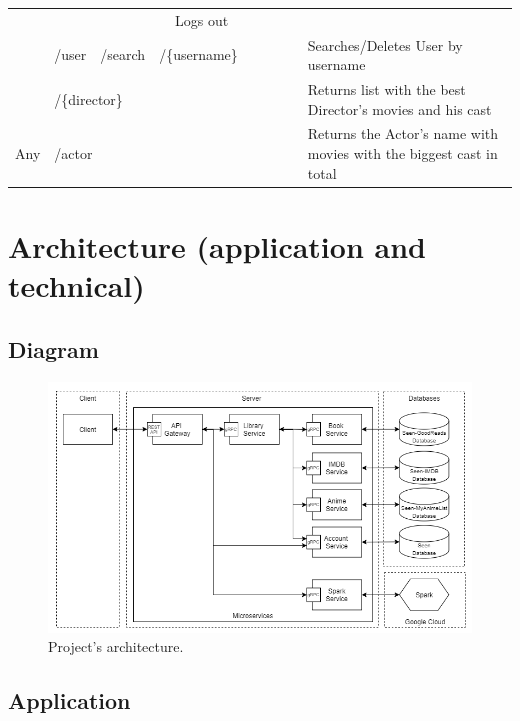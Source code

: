 \documentclass{article}
\newcommand{\xmark}{\ding{53}} %
\begin{document}
\begin{table}[H]
\begin{adjustbox}{width=1.6\textwidth}
\begin{tabular}{ c|l l l l|c|c|c|c|l }
    \xmark & & & &
    Logs out
    \\ \rowcolor{Gray}
    \multirow{-2}{*}{Regular} 
    & /user & /search & \multicolumn{2}{l|}{/\{username\}} &
    \xmark & & & \xmark &
    Searches/Deletes User by username
    \\ \hhline{-|----|-|-|-|-|~}
    & \multicolumn{4}{l|}{/\{director\}} &
    \xmark & & & &
    Returns list with the best Director's movies and his cast
    \\ 
    \multirow{-2}{*}{Any}
    & \multicolumn{4}{l|}{/actor} &
    \xmark & & & &
    Returns the Actor's name with movies with the biggest cast in total
  \end{tabular}
  \end{adjustbox}
\end{table}

\clearpage
\section{Architecture (application and technical)}
\label{sec:architecture}
  \subsection{Diagram}
  \begin{figure}[H]
    \centering
    \includegraphics[width=\textwidth]{ CloudNativeAppArchitecture.png }
    \caption{Project's architecture.}
    \label{img:architecture}
  \end{figure}

  \subsection{Application}
\end{document}

